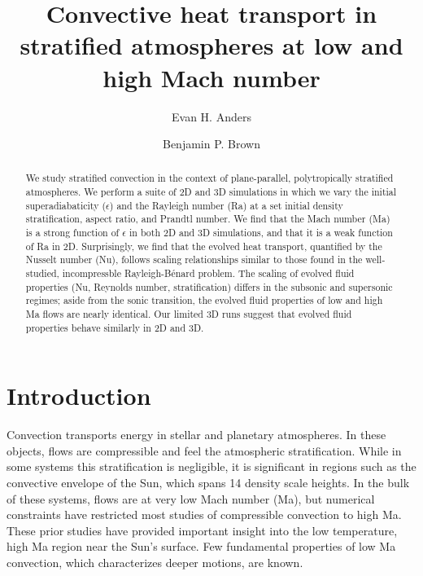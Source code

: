 \documentclass[aps, prl, twocolumn, nofootinbib, groupedaddress, amsfonts, amssymb, amsmath]{revtex4-1}
\begin{document}
\author{Evan H. Anders}
\author{Benjamin P. Brown}
\title{Convective heat transport in stratified atmospheres at low and high Mach number}

\begin{abstract}
We study stratified convection in the context of 
plane-parallel, polytropically stratified atmospheres. 
We perform a suite of 2D and 3D simulations in which we vary the initial
superadiabaticity ($\epsilon$) and the Rayleigh number (Ra) at a set
initial density stratification, aspect
ratio, and Prandtl number.
We find that the Mach number (Ma) is a strong function of $\epsilon$
in both 2D and 3D simulations, and that it is a 
weak function of Ra in 2D.
Surprisingly, we find that the evolved heat transport, 
quantified by the Nusselt number (Nu),
follows scaling relationships similar to those found in the well-studied, 
incompressble Rayleigh-B\'{e}nard problem.
The scaling of evolved fluid properties (Nu, Reynolds number,
stratification) differs in the subsonic and supersonic regimes; 
aside from the sonic transition, the evolved fluid properties
of low and high Ma flows are nearly identical.  
Our limited 3D runs suggest that
evolved fluid properties behave similarly in 2D and 3D.
\end{abstract}
\maketitle


\section{Introduction}
\label{sec:intro}
Convection transports energy in stellar and planetary atmospheres.
In these objects, flows are compressible and
feel the atmospheric stratification.  While in some systems this stratification 
is negligible, it is significant in regions such as
the convective envelope of the Sun, which spans 14 density scale heights.
In the bulk of these systems, flows are at very low Mach number (Ma), 
but numerical constraints have restricted most studies of 
compressible convection to high Ma.
These prior studies have provided important insight into the low temperature, 
high Ma region near the Sun's surface. Few fundamental
properties of low Ma convection, which characterizes deeper motions,
are known.
\end{document}
